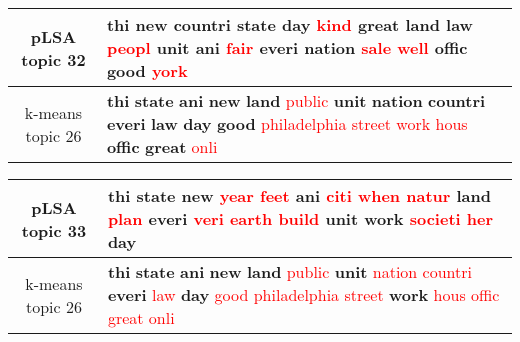 \begin{center}\begin{tabularx}{\textwidth} {
  | c | >{\raggedright\arraybackslash}X | } \hline 
pLSA topic 32 & \textbf{thi} \textbf{new} \textbf{countri} \textbf{state} \textbf{day} \textcolor{red}{kind} \textbf{great} \textbf{land} \textbf{law} \textcolor{red}{peopl} \textbf{unit} \textbf{ani} \textcolor{red}{fair} \textbf{everi} \textbf{nation} \textcolor{red}{sale} \textcolor{red}{well} \textbf{offic} \textbf{good} \textcolor{red}{york} \\ \hline 
k-means topic 26 & \textbf{thi} \textbf{state} \textbf{ani} \textbf{new} \textbf{land} \textcolor{red}{public} \textbf{unit} \textbf{nation} \textbf{countri} \textbf{everi} \textbf{law} \textbf{day} \textbf{good} \textcolor{red}{philadelphia} \textcolor{red}{street} \textcolor{red}{work} \textcolor{red}{hous} \textbf{offic} \textbf{great} \textcolor{red}{onli} \\ \hline 
\end{tabularx}

\end{center}

\begin{center}\begin{tabularx}{\textwidth} {
  | c | >{\raggedright\arraybackslash}X | } \hline 
pLSA topic 33 & \textbf{thi} \textbf{state} \textbf{new} \textcolor{red}{year} \textcolor{red}{feet} \textbf{ani} \textcolor{red}{citi} \textcolor{red}{when} \textcolor{red}{natur} \textbf{land} \textcolor{red}{plan} \textbf{everi} \textcolor{red}{veri} \textcolor{red}{earth} \textcolor{red}{build} \textbf{unit} \textbf{work} \textcolor{red}{societi} \textcolor{red}{her} \textbf{day} \\ \hline 
k-means topic 26 & \textbf{thi} \textbf{state} \textbf{ani} \textbf{new} \textbf{land} \textcolor{red}{public} \textbf{unit} \textcolor{red}{nation} \textcolor{red}{countri} \textbf{everi} \textcolor{red}{law} \textbf{day} \textcolor{red}{good} \textcolor{red}{philadelphia} \textcolor{red}{street} \textbf{work} \textcolor{red}{hous} \textcolor{red}{offic} \textcolor{red}{great} \textcolor{red}{onli} \\ \hline 
\end{tabularx}

\end{center}

